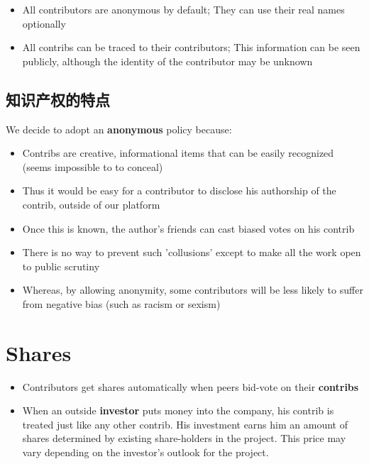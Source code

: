 \documentclass[12pt, orivec, fleqn]{article}
\newcommand{\cc}[2]{#1}
\newcommand{\cc}[2]{#2}
\begin{document}
\begin{itemize}
	\item All contributors are anonymous by default;  They can use their real names optionally
	
	\item All contribs can be traced to their contributors;  This information can be seen publicly, although the identity of the contributor may be unknown
\end{itemize}

\secttoc
\subsection{\cc{知识产权的特点}{Uniqueness of intellectual properties}}

We decide to adopt an \textbf{anonymous} policy because:
\begin{itemize}
	\item Contribs are creative, informational items that can be easily recognized (seems impossible to to conceal)
	\item Thus it would be easy for a contributor to disclose his authorship of the contrib, outside of our platform
	\item Once this is known, the author's friends can cast biased votes on his contrib
	\item There is no way to prevent such 'collusions' except to make all the work open to public scrutiny
	\item Whereas, by allowing anonymity, some contributors will be less likely to suffer from negative bias (such as racism or sexism)
\end{itemize}

\secttoc
\section{Shares}

\begin{itemize}
	\item Contributors get shares automatically when peers bid-vote on their \textbf{contribs}
	
	\item When an outside \textbf{investor} puts money into the company, his contrib is treated just like any other contrib.  His investment earns him an amount of shares determined by existing share-holders in the project.  This price may vary depending on the investor's outlook for the project.	
\end{itemize}
\end{document}
